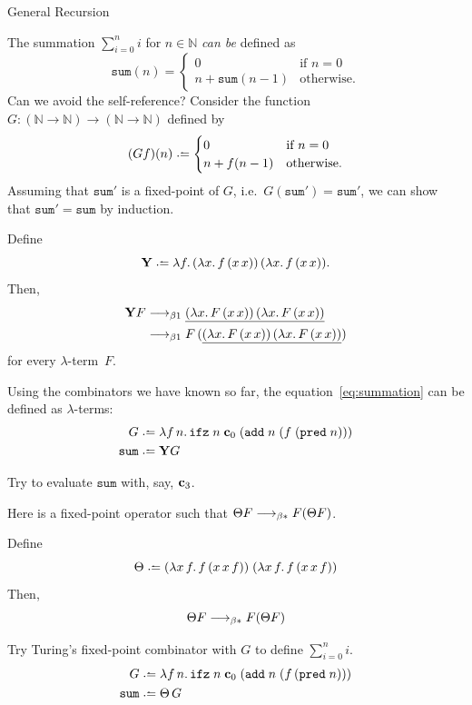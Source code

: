\begin{frame}[allowframebreaks]{General Recursion}

  The summation $\sum_{i = 0}^{n} i$ for $n \in \mathbb{N}$ \emph{can
  be} defined as
\[
  \mathtt{sum}(n) =
    \begin{cases} 
     0 & \text{if } n = 0 \\
     n + \mathtt{sum}(n - 1)  & \text{otherwise}.
    \end{cases}
\]
Can we avoid the self-reference? Consider the function
$G\colon (\mathbb{N} \to \mathbb{N}) \to (\mathbb{N} \to \mathbb{N})$
defined by
\begin{equation} \label{eq:summation}
  (Gf)(n) \defeq
  \begin{cases}
     0 & \text{if } n = 0 \\
     n + f(n - 1)  & \text{otherwise}.
  \end{cases}
\end{equation}
Assuming that $\mathtt{sum}'$ is a fixed-point of $G$, i.e.\
$G(\mathtt{sum}') =\mathtt{sum}'$, we can show that $\mathtt{sum}' =
\mathtt{sum}$ by induction. 

\framebreak
\begin{proposition}
  Define
  \[
    \mathbf{Y} \defeq \lambda f.\, (\lambda x.\, f\,(x\,x))\,(\lambda
    x.\,f\,(x\,x)).
  \]
  Then, 
  \begin{align*}
    \mathbf{Y}F
    & \longrightarrow_{\beta1} \underline{(\lambda x.\,F\,(x\,x))\,(\lambda x.\, F\,(x\,x))} \\
    & \longrightarrow_{\beta1} F\,(\underline{(\lambda x.\,F\,(x\,x))\,(\lambda x.\,
      F\,(x\,x))})
  \end{align*}
  for every $\lambda$-term~$F$. 
\end{proposition}

\framebreak
\begin{example}
  Using the combinators we have known so far, the equation~\eqref{eq:summation}
  can be defined as $\lambda$-terms:
  \begin{align*}
    G \defeq{} & 
    \lambda f\,n.\, \mathtt{ifz}\;n\;\bc_0\;
    (\add\;n\;(f\;(\mathtt{pred}\;n))) \\
    \mathtt{sum} \defeq{} & \mathbf{Y}G
  \end{align*}
\end{example}
  Try to evaluate $\mathtt{sum}$ with, say, $\mathbf{c}_3$.

\framebreak
Here is a fixed-point operator such that $\Theta F \longrightarrow_{\beta*} F(\Theta F)$.
\begin{proposition}
  Define 
  \[
    \Theta \defeq 
    (\lambda x\,f.\,f\,(x\,x\,f))\;
    (\lambda x\,f.\,f\,(x\,x\,f))
  \]
  Then, 
  \[
    \Theta F \longrightarrow_{\beta*} F (\Theta F)
  \]
\end{proposition}
Try Turing's fixed-point combinator with $G$ to define $\sum_{i=0}^n i$.
\begin{align*}
  G \defeq{} &
  \lambda f\,n.\,
  \mathtt{ifz}\;n\;\bc_0\;
  (\add\;n\;(f\,(\mathtt{pred}\;n))) \\
  \mathtt{sum} \defeq\; & \Theta\,G 
\end{align*}


\end{frame}
